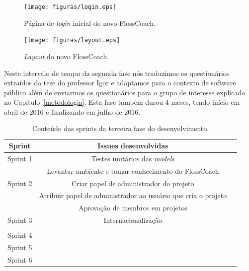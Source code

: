 \begin{figure}[h]
	\centering
	\label{fig:prototipo}
		\texttt{[image: figuras/login.eps]}
	\caption{Página de \textit{login} inicial do novo FlossCoach.}
\end{figure}


\begin{figure}[h]
	\centering
	\label{fig:prototipo}
		\texttt{[image: figuras/layout.eps]}
	\caption{\textit{Layout} do novo FlossCoach.}
\end{figure}


Neste intervalo de tempo da segunda fase nós traduzimos os questionários extraídos
da tese do professor Igor e adaptamos para o contexto de software público além de 
enviarmos os questionários para o grupo de interesse explicado no Capítulo~\ref{metodologia}.
Esta fase também durou 4 meses, tendo início em abril de 2016 e finalizando em julho de 2016.



\begin{table}[h]
	\centering
	\label{tab01}
	
	\begin{tabular}{ccc}
		\toprule
		\textbf{Sprint} & \textbf{Issues desenvolvidas} \\
		\midrule
		Sprint 1 & Testes unitários das \textit{models} \\
			 & Levantar ambiente e tomar conhecimento do FlossCoach \\
		\midrule
		Sprint 2 & Criar papel de administrador do projeto\\
			 & Atribuir papel de administrador ao usuário que cria o projeto \\
			 & Aprovação de membros em projetos \\
		\midrule		
		Sprint 3 & Internacionalização \\
			 & \\
		\midrule		
		Sprint 4 & \\
		\midrule		
		Sprint 5 & \\
		\midrule
		Sprint 6 & \\
		\bottomrule
	\end{tabular}

	\caption{Conteúdo das sprints da terceira fase do desenvolvimento.}
\end{table}
